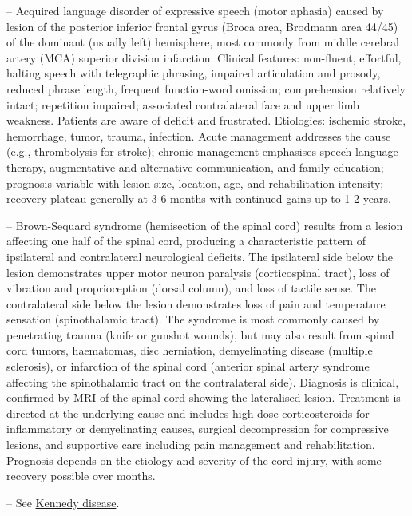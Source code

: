 -- Acquired language disorder of expressive speech (motor aphasia) caused by lesion of the posterior inferior frontal gyrus (Broca area, Brodmann area 44/45) of the dominant (usually left) hemisphere, most commonly from middle cerebral artery (MCA) superior division infarction. Clinical features: non-fluent, effortful, halting speech with telegraphic phrasing, impaired articulation and prosody, reduced phrase length, frequent function-word omission; comprehension relatively intact; repetition impaired; associated contralateral face and upper limb weakness. Patients are aware of deficit and frustrated. Etiologies: ischemic stroke, hemorrhage, tumor, trauma, infection. Acute management addresses the cause (e.g., thrombolysis for stroke); chronic management emphasises speech-language therapy, augmentative and alternative communication, and family education; prognosis variable with lesion size, location, age, and rehabilitation intensity; recovery plateau generally at 3-6 months with continued gains up to 1-2 years.

-- Brown-Sequard syndrome (hemisection of the spinal cord) results from a lesion affecting one half of the spinal cord, producing a characteristic pattern of ipsilateral and contralateral neurological deficits. The ipsilateral side below the lesion demonstrates upper motor neuron paralysis (corticospinal tract), loss of vibration and proprioception (dorsal column), and loss of tactile sense. The contralateral side below the lesion demonstrates loss of pain and temperature sensation (spinothalamic tract). The syndrome is most commonly caused by penetrating trauma (knife or gunshot wounds), but may also result from spinal cord tumors, haematomas, disc herniation, demyelinating disease (multiple sclerosis), or infarction of the spinal cord (anterior spinal artery syndrome affecting the spinothalamic tract on the contralateral side). Diagnosis is clinical, confirmed by MRI of the spinal cord showing the lateralised lesion. Treatment is directed at the underlying cause and includes high-dose corticosteroids for inflammatory or demyelinating causes, surgical decompression for compressive lesions, and supportive care including pain management and rehabilitation. Prognosis depends on the etiology and severity of the cord injury, with some recovery possible over months.

-- See \hyperlink{Kennedy Disease}{Kennedy disease}.


